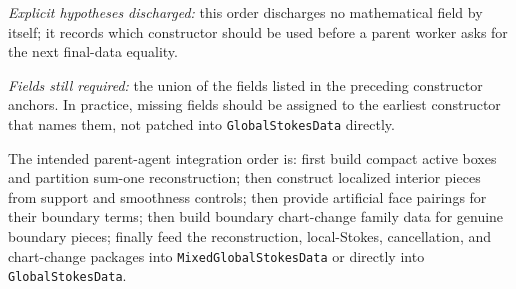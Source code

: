 \begin{theorem}
  \label{anc:m6_constructor_dependency_order}
  \leanok
  \emph{Explicit hypotheses discharged:}
  this order discharges no mathematical field by itself; it records which
  constructor should be used before a parent worker asks for the next final-data
  equality.

  \emph{Fields still required:}
  the union of the fields listed in the preceding constructor anchors.  In
  practice, missing fields should be assigned to the earliest constructor that
  names them, not patched into \texttt{GlobalStokesData} directly.

  The intended parent-agent integration order is:
  first build compact active boxes and partition sum-one reconstruction; then
  construct localized interior pieces from support and smoothness controls;
  then provide artificial face pairings for their boundary terms; then build
  boundary chart-change family data for genuine boundary pieces; finally feed
  the reconstruction, local-Stokes, cancellation, and chart-change packages
  into \texttt{MixedGlobalStokesData} or directly into
  \texttt{GlobalStokesData}.
\end{theorem}

\endgroup
